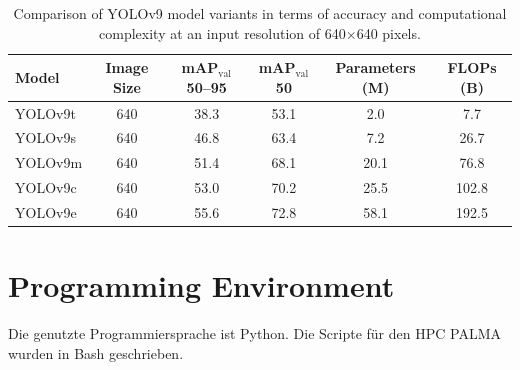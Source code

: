 

\begin{table}[h]
\centering
\begin{tabular}{l|c|c|c|c|c} %
\textbf{Model} & \textbf{Image Size} & \textbf{mAP$_{\text{val}}$ 50--95} & \textbf{mAP$_{\text{val}}$ 50} & \textbf{Parameters (M)} & \textbf{FLOPs (B)} \\
\hline
YOLOv9t & 640 & 38.3 & 53.1 & 2.0 & 7.7 \\
YOLOv9s & 640 & 46.8 & 63.4 & 7.2 & 26.7 \\
YOLOv9m & 640 & 51.4 & 68.1 & 20.1 & 76.8 \\
YOLOv9c & 640 & 53.0 & 70.2 & 25.5 & 102.8 \\
YOLOv9e & 640 & 55.6 & 72.8 & 58.1 & 192.5 \\
\end{tabular}
\caption{Comparison of YOLOv9 model variants in terms of accuracy and computational complexity at an input resolution of 640$\times$640 pixels. \cite{ultralyics_yolov9,wang2024_sapkota}}
\label{tab:yolov9-models}
\end{table}





\section{Programming Environment}
Die genutzte Programmiersprache ist Python. Die Scripte für den \acrshort{HPC} \acrshort{PALMA} wurden in Bash geschrieben.

